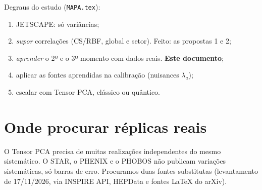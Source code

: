 \documentclass[11pt,a4paper]{article}
\newcommand{\arq}[1]{\texttt{\nolinkurl{#1}}}
\begin{document}
Degraus do estudo (\arq{MAPA.tex}):
\begin{enumerate}[nosep]
\item[0.] JETSCAPE: só variâncias;
\item[1.] \emph{supor} correlações (CS/RBF, global e setor). Feito: as propostas 1 e 2;
\item[2.] \emph{aprender} o 2º e o 3º momento com dados reais. \textbf{Este documento};
\item[3.] aplicar as fontes aprendidas na calibração (nuisances $\lambda_a$);
\item[4.] escalar com Tensor PCA, clássico ou quântico.
\end{enumerate}

\section{Onde procurar réplicas reais}
O Tensor PCA precisa de muitas realizações independentes do mesmo sistemático. O STAR, o PHENIX e o PHOBOS não publicam variações
sistemáticas, só barras de erro. Procuramos duas fontes substitutas (levantamento de 17/11/2026, via INSPIRE API, HEPData e fontes \LaTeX{} do arXiv).
\end{document}
